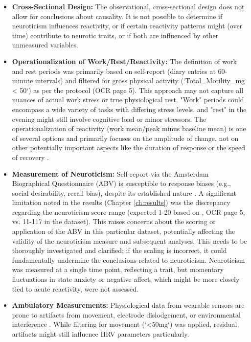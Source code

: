 \documentclass[11pt, a4paper]{report}
\begin{document}
\begin{itemize}
    \item \textbf{Cross-Sectional Design:} The observational, cross-sectional design does not allow for conclusions about causality. It is not possible to determine if neuroticism influences reactivity, or if certain reactivity patterns might (over time) contribute to neurotic traits, or if both are influenced by other unmeasured variables.
    \item \textbf{Operationalization of Work/Rest/Reactivity:}
        The definition of work and rest periods was primarily based on self-report (diary entries at 60-minute intervals) and filtered for gross physical activity (`Total_Motility_mg < 50`) as per the protocol \cite{ThesisTempPDF} (OCR page 5). This approach may not capture all nuances of actual work stress or true physiological rest. "Work" periods could encompass a wide variety of tasks with differing stress levels, and "rest" in the evening might still involve cognitive load or minor stressors.
        The operationalization of reactivity (work mean/peak minus baseline mean) is one of several options and primarily focuses on the amplitude of change, not on other potentially important aspects like the duration of response or the speed of recovery \cite{ChidaHamer2008}.
    \item \textbf{Measurement of Neuroticism:}
        Self-report via the Amsterdam Biographical Questionnaire (ABV) is susceptible to response biases (e.g., social desirability, recall bias), despite its established nature \cite{EysenckEysenck1975}.
        A significant limitation noted in the results (Chapter \ref{ch:results}) was the discrepancy regarding the neuroticism score range (expected 1-20 based on \cite{ThesisTempPDF}, OCR page 5, vs. 11-117 in the dataset). This raises concerns about the scoring or application of the ABV in this particular dataset, potentially affecting the validity of the neuroticism measure and subsequent analyses. This needs to be thoroughly investigated and clarified; if the scaling is incorrect, it could fundamentally undermine the conclusions related to neuroticism.
        Neuroticism was measured at a single time point, reflecting a trait, but momentary fluctuations in state anxiety or negative affect, which might be more closely tied to acute reactivity, were not assessed.
    \item \textbf{Ambulatory Measurements:}
        Physiological data from wearable sensors are prone to artifacts from movement, electrode dislodgement, or environmental interference \cite{deGeusGevonden2024}. While filtering for movement (`<50mg`) was applied, residual artifacts might still influence HRV parameters particularly.

\end{itemize}
\end{document}
